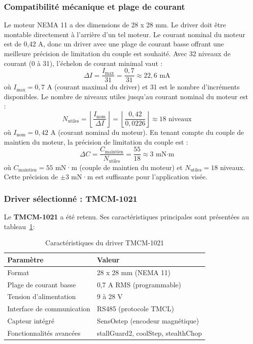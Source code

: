 \subsubsection{Compatibilité mécanique et plage de courant}
Le moteur NEMA 11 a des dimensions de 28 x 28 mm. 
Le driver doit être montable directement à l'arrière d'un tel moteur. 
Le courant nominal du moteur est de 0,42 A, donc un driver avec une plage de courant basse offrant une meilleure précision de limitation du couple est souhaité.
Avec 32 niveaux de courant (0 à 31), l'échelon de courant minimal vaut :
\begin{equation}
    \Delta I = \frac{I_{\text{max}}}{31} = \frac{0,7}{31} \approx 22,6 \text{ mA}
    \label{eq:echelon_courant}
\end{equation}
\noindent où $I_{\text{max}} = 0,7$ A (courant maximal du driver) et 31 est le nombre d'incréments disponibles.
Le nombre de niveaux utiles jusqu'au courant nominal du moteur est :
\begin{equation}
    N_{\text{utiles}} = \left\lfloor \frac{I_{\text{nom}}}{\Delta I} \right\rfloor = \left\lfloor \frac{0,42}{0,0226} \right\rfloor \approx 18 \text{ niveaux}
    \label{eq:niveaux_utiles}
\end{equation}
\noindent où $I_{\text{nom}} = 0,42$ A (courant nominal du moteur).
En tenant compte du couple de maintien du moteur, la précision de limitation du couple est :
\begin{equation}
    \Delta C = \frac{C_{\text{maintien}}}{N_{\text{utiles}}} = \frac{55}{18} \approx 3 \text{ mN·m}
    \label{eq:precision_couple}
\end{equation}
\noindent où $C_{\text{maintien}} = 55$ mN·m (couple de maintien du moteur) et $N_{\text{utiles}} = 18$ niveaux. Cette précision de $\pm 3$ mN·m est suffisante pour l'application visée.
\subsubsection{Driver sélectionné : TMCM-1021}
Le \textbf{TMCM-1021} a été retenu. Ses caractéristiques principales sont présentées au tableau~\ref{tab:specs_driver}:
\begin{table}[H]
  \centering
  \caption{Caractéristiques du driver TMCM-1021}
  \label{tab:specs_driver}
  \begin{tabular}{ll}
    \toprule
    \textbf{Paramètre} & \textbf{Valeur} \\
    \midrule
    Format & 28 x 28 mm (NEMA 11) \\
    Plage de courant basse & 0,7 A RMS (programmable) \\
    Tension d'alimentation & 9 à 28 V \\
    Interface de communication & RS485 (protocole TMCL) \\
    Capteur intégré & SensOstep (encodeur magnétique) \\
    Fonctionnalités avancées & stallGuard2, coolStep, stealthChop \\
    \bottomrule
  \end{tabular}
\end{table}
